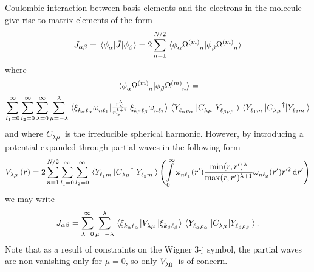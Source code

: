 \documentclass[draft]{article}
\begin{document}
Coulombic interaction between basis elements and the electrons in the
molecule give rise to matrix elements of the form
\begin{equation*}
  J_{\alpha \beta}
  =
  \mel*{
    \sturmian[_{\alpha}]
  }{
    \hat{J}
  }{
    \sturmian[_{\beta}]
  }
  =
  2
  \sum_{n = 1}^{N/2}
  \braket*{
    \sturmian[_{\alpha}]
    \orbital[^{\lr{\proj}}_n]
  }{
    \sturmian[_{\beta}]
    \orbital[^{\lr{\proj}}_n]
  }
\end{equation*}
where
\begin{multline*}
  \braket*{
    \sturmian[_{\alpha}]
    \orbital[^{\lr{\proj}}_n]
  }{
    \sturmian[_{\beta}]
    \orbital[^{\lr{\proj}}_n]
  }
  =
  \\
  \sum_{l_{1} = 0}^{\infty}
  \sum_{l_{2} = 0}^{\infty}
  \sum_{\lambda = 0}^{\infty}
  \sum_{\mu = -\lambda}^{\lambda}
  \mel*{
    \laguerre[_{k_{\alpha} \ang_{\alpha}}]
    \orbitalpw[_{n \ang_{1}}]
  }{
    \tfrac
    {
      r_{<}^{\lambda}
    }
    {
      r_{>}^{\lambda + 1}
    }
  }{
    \laguerre[_{k_{\beta} \ang_{\beta}}]
    \orbitalpw[_{n \ang_{2}}]
  }
  \mel*{
    \harmonic[_{\ang_{\alpha} \rho_{\alpha}}]
  }{
    \irrep[_{\lambda \mu}]
  }{
    \harmonic[_{\ang_{\beta} \rho_{\beta}}]
  }
  \mel*{
    \harmonic[_{\ang_{1} \proj}]
  }{
    {\irrep[_{\lambda \mu}]}^{\dagger}
  }{
    \harmonic[_{\ang_{2} \proj}]
  }
\end{multline*}
and where $\irrep[_{\lambda \mu}]$ is the irreducible spherical harmonic.
However, by introducing a potential expanded through partial waves in the
following form
\begin{equation*}
  V\indices{_{\lambda \mu}}\lr{r}
  =
  2
  \sum_{n = 1}^{N/2}
  \sum_{l_{1} = 0}^{\infty}
  \sum_{l_{2} = 0}^{\infty}
  \mel*{
    \harmonic[_{\ang_{1} \proj}]
  }{
    {\irrep[_{\lambda \mu}]}^{\dagger}
  }{
    \harmonic[_{\ang_{2} \proj}]
  }
  \lr[\Bigg]
  {
    \int\limits_{0}^{\infty}
    \orbitalpw[_{n \ang_{1}}]\lr{r'}
    \frac
    {
      \min\lr{r, r'}^{\lambda}
    }
    {
      \max\lr{r, r'}^{\lambda + 1}
    }
    \orbitalpw[_{n \ang_{2}}]\lr{r'}
    r'^{2}
    \dd{r'}
  }
\end{equation*}
we may write
\begin{equation*}
  J_{\alpha \beta}
  =
  \sum_{\lambda = 0}^{\infty}
  \sum_{\mu = -\lambda}^{\lambda}
  \mel*{
    \laguerre[_{k_{\alpha} \ang_{\alpha}}]
  }{
    V\indices{_{\lambda \mu}}
  }{
    \laguerre[_{k_{\beta} \ang_{\beta}}]
  }
  \mel*{
    \harmonic[_{\ang_{\alpha} \rho_{\alpha}}]
  }{
    \irrep[_{\lambda \mu}]
  }{
    \harmonic[_{\ang_{\beta} \rho_{\beta}}]
  }.
\end{equation*}
Note that as a result of constraints on the Wigner 3-j symbol, the partial waves
are non-vanishing only for $\mu = 0$, so only $V\indices{_{\lambda 0}}$ is of
concern.
\end{document}
